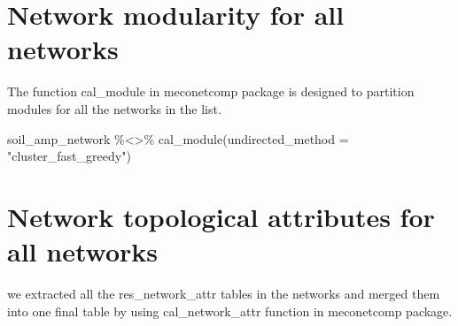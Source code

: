 \documentclass[
]{book}
\newenvironment{Shaded}{\begin{snugshade}}{\end{snugshade}}
\newcommand{\AttributeTok}[1]{\textcolor[rgb]{0.77,0.63,0.00}{#1}}
\newcommand{\CommentTok}[1]{\textcolor[rgb]{0.56,0.35,0.01}{\textit{#1}}}
\newcommand{\FloatTok}[1]{\textcolor[rgb]{0.00,0.00,0.81}{#1}}
\newcommand{\FunctionTok}[1]{\textcolor[rgb]{0.00,0.00,0.00}{#1}}
\newcommand{\NormalTok}[1]{#1}
\newcommand{\OtherTok}[1]{\textcolor[rgb]{0.56,0.35,0.01}{#1}}
\newcommand{\SpecialCharTok}[1]{\textcolor[rgb]{0.00,0.00,0.00}{#1}}
\newcommand{\StringTok}[1]{\textcolor[rgb]{0.31,0.60,0.02}{#1}}
\begin{document}
\begin{Shaded}
\end{Shaded}

\hypertarget{network-modularity-for-all-networks}{%
\section{Network modularity for all networks}\label{network-modularity-for-all-networks}}

The function cal\_module in meconetcomp package is designed to partition modules for all the networks in the list.

\begin{Shaded}
\begin{Highlighting}[]
\NormalTok{soil\_amp\_network }\SpecialCharTok{\%\textless{}\textgreater{}\%} \FunctionTok{cal\_module}\NormalTok{(}\AttributeTok{undirected\_method =} \StringTok{"cluster\_fast\_greedy"}\NormalTok{)}
\end{Highlighting}
\end{Shaded}

\hypertarget{network-topological-attributes-for-all-networks}{%
\section{Network topological attributes for all networks}\label{network-topological-attributes-for-all-networks}}

we extracted all the res\_network\_attr tables in the networks and merged them into one final table by using cal\_network\_attr function in meconetcomp package.
\end{document}
